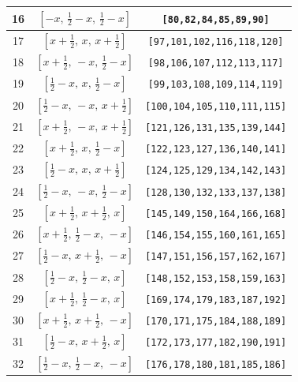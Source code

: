 \documentclass[fleqn,8pt]{jsarticle}
\begin{document}
\begin{longtable}{ccc}
16 & $\left[ - x,\, \frac{1}{2} - x,\, \frac{1}{2} - x \right]$ & {\tt [80,82,84,85,89,90]} \\ \hline
17 & $\left[ x + \frac{1}{2},\, x,\, x + \frac{1}{2} \right]$ & {\tt [97,101,102,116,118,120]} \\ \hline
18 & $\left[ x + \frac{1}{2},\, - x,\, \frac{1}{2} - x \right]$ & {\tt [98,106,107,112,113,117]} \\ \hline
19 & $\left[ \frac{1}{2} - x,\, x,\, \frac{1}{2} - x \right]$ & {\tt [99,103,108,109,114,119]} \\ \hline
20 & $\left[ \frac{1}{2} - x,\, - x,\, x + \frac{1}{2} \right]$ & {\tt [100,104,105,110,111,115]} \\ \hline
21 & $\left[ x + \frac{1}{2},\, - x,\, x + \frac{1}{2} \right]$ & {\tt [121,126,131,135,139,144]} \\ \hline
22 & $\left[ x + \frac{1}{2},\, x,\, \frac{1}{2} - x \right]$ & {\tt [122,123,127,136,140,141]} \\ \hline
23 & $\left[ \frac{1}{2} - x,\, x,\, x + \frac{1}{2} \right]$ & {\tt [124,125,129,134,142,143]} \\ \hline
24 & $\left[ \frac{1}{2} - x,\, - x,\, \frac{1}{2} - x \right]$ & {\tt [128,130,132,133,137,138]} \\ \hline
25 & $\left[ x + \frac{1}{2},\, x + \frac{1}{2},\, x \right]$ & {\tt [145,149,150,164,166,168]} \\ \hline
26 & $\left[ x + \frac{1}{2},\, \frac{1}{2} - x,\, - x \right]$ & {\tt [146,154,155,160,161,165]} \\ \hline
27 & $\left[ \frac{1}{2} - x,\, x + \frac{1}{2},\, - x \right]$ & {\tt [147,151,156,157,162,167]} \\ \hline
28 & $\left[ \frac{1}{2} - x,\, \frac{1}{2} - x,\, x \right]$ & {\tt [148,152,153,158,159,163]} \\ \hline
29 & $\left[ x + \frac{1}{2},\, \frac{1}{2} - x,\, x \right]$ & {\tt [169,174,179,183,187,192]} \\ \hline
30 & $\left[ x + \frac{1}{2},\, x + \frac{1}{2},\, - x \right]$ & {\tt [170,171,175,184,188,189]} \\ \hline
31 & $\left[ \frac{1}{2} - x,\, x + \frac{1}{2},\, x \right]$ & {\tt [172,173,177,182,190,191]} \\ \hline
32 & $\left[ \frac{1}{2} - x,\, \frac{1}{2} - x,\, - x \right]$ & {\tt [176,178,180,181,185,186]} \\
\end{longtable}
\renewcommand{\arraystretch}{1.2}
\end{document}
